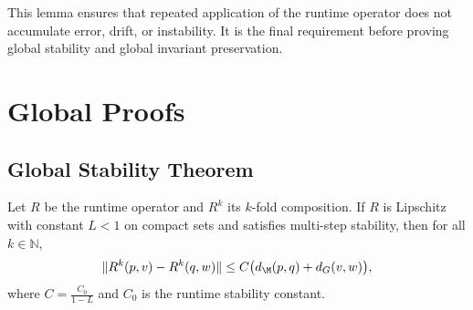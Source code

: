 \begin{remark}
This lemma ensures that repeated application of the runtime operator does
not accumulate error, drift, or instability. It is the final requirement
before proving global stability and global invariant preservation.
\end{remark}

\section{Global Proofs}


\subsection{Global Stability Theorem}

\begin{theorem}
Let $R$ be the runtime operator and $R^k$ its $k$-fold composition.
If $R$ is Lipschitz with constant $L < 1$ on compact sets and satisfies
multi-step stability, then for all $k \in \mathbb{N}$,
\[
\|R^k(p,v) - R^k(q,w)\|
\le
C\big(d_\M(p,q) + d_G(v,w)\big),
\]
where $C = \frac{C_0}{1-L}$ and $C_0$ is the runtime stability constant.
\end{theorem}

